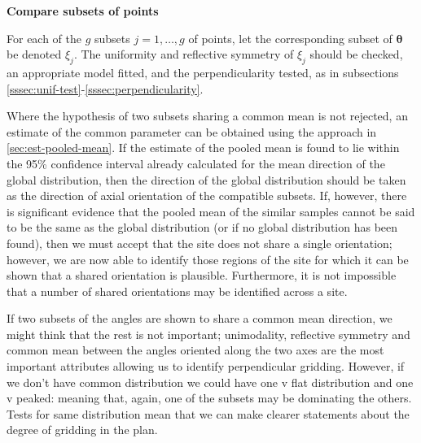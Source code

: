 \documentclass[../../ArchStats.tex]{subfiles}
\begin{document}
\textbf{Compare subsets of points}

For each of the $g$ subsets $j = 1, \dots, g$ of points, let the corresponding subset of $\boldsymbol{\theta}$ be denoted $\xi_j$. The uniformity and reflective symmetry of  $\xi_j$ should be checked, an appropriate model fitted, and the perpendicularity tested, as in subsections \ref{sssec:unif-test}-\ref{sssec:perpendicularity}. 



Where the hypothesis of two subsets sharing a common mean is not rejected, an estimate of the common parameter can be obtained using the approach in \ref{sec:est-pooled-mean}. If the estimate of the pooled mean is found to lie within the 95\% confidence interval already calculated for the mean direction of the global distribution, then the direction of the global distribution should be taken as the direction of axial orientation of the compatible subsets. If, however,  there is significant evidence that the pooled mean of the similar samples cannot be said to be the same as the global distribution (or if no global distribution has been found), then we must accept that the site does not share a single orientation; however, we are now able to identify those regions of the site for which it can be shown that a shared orientation is plausible. Furthermore, it is not impossible that a  number of shared orientations may be identified across a site.

If two subsets of the angles are shown to share a common mean direction, we might think that the rest is not important; unimodality, reflective symmetry and common mean between the angles oriented along the two axes are the most important attributes allowing us to identify perpendicular gridding. However, if we don't have common distribution we could have one v flat distribution and one v peaked: meaning that, again, one of the subsets may be dominating the others. Tests for same distribution mean that we can make clearer statements about the degree of gridding in the plan.

\end{document}
